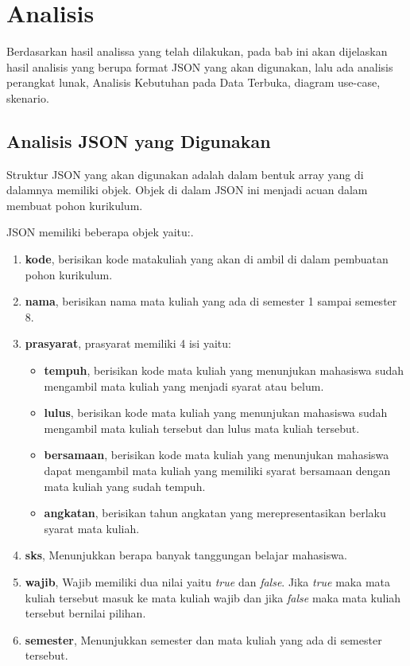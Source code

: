 \chapter{Analisis}
\label{chap: Analsisis}

Berdasarkan hasil analissa yang telah dilakukan, pada bab ini akan dijelaskan hasil analisis yang berupa format JSON yang akan digunakan, lalu ada analisis perangkat lunak, Analisis Kebutuhan pada Data Terbuka, diagram use-case, skenario.

\section{Analisis JSON yang Digunakan}
\label{sec: Analisis JSON yang Digunakan}

Struktur JSON yang akan digunakan adalah dalam bentuk array yang di dalamnya memiliki objek.  
Objek di dalam JSON ini menjadi acuan dalam membuat pohon kurikulum. 

JSON memiliki beberapa objek yaitu:.
\begin{enumerate}
\item \textbf{kode}, berisikan kode matakuliah yang akan di ambil di dalam pembuatan pohon kurikulum.
\item \textbf{nama}, berisikan nama mata kuliah yang ada di semester 1 sampai semester 8.
\item \textbf{prasyarat}, prasyarat memiliki 4 isi yaitu:
\begin{itemize}
\item \textbf{tempuh}, berisikan kode mata kuliah yang menunjukan mahasiswa sudah mengambil mata kuliah yang menjadi syarat atau belum. 
\item \textbf{lulus}, berisikan kode mata kuliah yang menunjukan mahasiswa sudah mengambil mata kuliah tersebut dan lulus mata kuliah tersebut.
\item \textbf{bersamaan}, berisikan kode mata kuliah yang menunjukan mahasiswa dapat mengambil mata kuliah yang memiliki syarat bersamaan dengan mata kuliah yang sudah tempuh.
\item \textbf{angkatan}, berisikan tahun angkatan yang merepresentasikan berlaku syarat mata kuliah.
\end{itemize}
\item \textbf{sks}, Menunjukkan berapa banyak tanggungan belajar mahasiswa.
\item \textbf{wajib}, Wajib memiliki dua nilai yaitu \textit{true} dan \textit{false}. Jika \textit{true} maka mata kuliah tersebut masuk ke mata kuliah wajib dan jika \textit{false} maka mata kuliah tersebut bernilai pilihan. 
\item \textbf{semester}, Menunjukkan semester dan mata kuliah yang ada di semester tersebut.
\end{enumerate}

